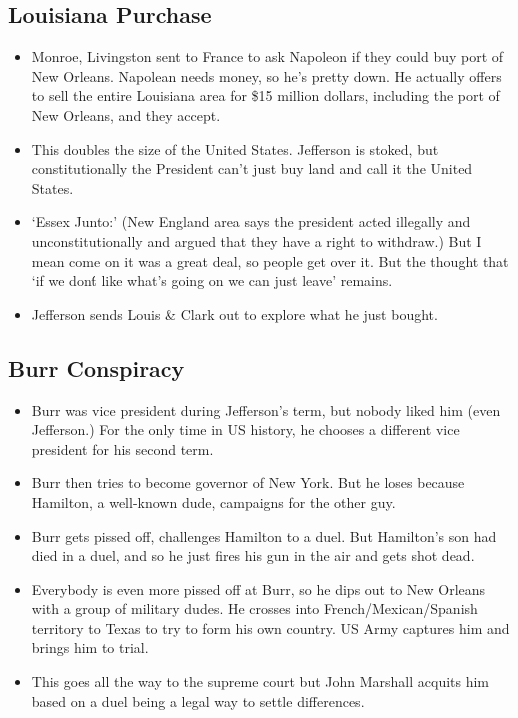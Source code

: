 \documentclass{article}
\begin{document}
    \subsection{Louisiana Purchase}
      \begin{itemize}
        \item Monroe, Livingston sent to France to ask Napoleon if they could buy port of New Orleans. Napolean needs money, so he's pretty down. He actually offers to sell the entire Louisiana area for \$15 million dollars, including the port of New Orleans, and they accept.
        \item This doubles the size of the United States. Jefferson is stoked, but constitutionally the President can't just buy land and call it the United States. 
        \item `Essex Junto:' (New England area says the president acted illegally and unconstitutionally and argued that they have a right to withdraw.) But I mean come on it was a great deal, so people get over it. But the thought that `if we don\'t like what's going on we can just leave' remains.
        \item Jefferson sends Louis \& Clark out to explore what he just bought.
      \end{itemize}

    \subsection{Burr Conspiracy}
      \begin{itemize}
        \item Burr was vice president during Jefferson's term, but nobody liked him (even Jefferson.) For the only time in US history, he chooses a different vice president for his second term.
        \item Burr then tries to become governor of New York. But he loses because Hamilton, a well-known dude, campaigns for the other guy.
        \item Burr gets pissed off, challenges Hamilton to a duel. But Hamilton's son had died in a duel, and so he just fires his gun in the air and gets shot dead.
        \item Everybody is even more pissed off at Burr, so he dips out to New Orleans with a group of military dudes. He crosses into French/Mexican/Spanish territory to Texas to try to form his own country. US Army captures him and brings him to trial.
        \item This goes all the way to the supreme court but John Marshall acquits him based on a duel being a legal way to settle differences. 
      \end{itemize}
\end{document}
